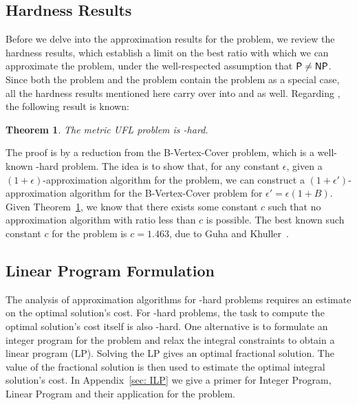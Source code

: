 \documentclass[oneside,final]{ucr}
\newtheorem{theorem}{Theorem}
\begin{document}
\subsection{Hardness Results}
Before we delve into the approximation results for the
{\UFL} problem, we review the hardness results, which
establish a limit on the best ratio with which we can
approximate the {\UFL} problem, under the well-respected
assumption that ${\mbox{\sf P}} \neq {\mbox{\sf NP}}$. Since both the {\FTFL}
problem and the {\FTFP} problem contain the {\UFL} problem
as a special case, all the hardness results mentioned here
carry over into {\FTFL} and {\FTFP} as well. Regarding
{\UFL}, the following result is known:
\begin{theorem}\cite{GuhaK98}
  \label{thm:maxsnp}
  The metric UFL problem is \MaxSNP-hard.
\end{theorem}
The proof is by a reduction from the B-Vertex-Cover problem,
which is a well-known \MaxSNP-hard problem. The idea is to
show that, for any constant $\epsilon$, given a
$(1+\epsilon)$-approximation algorithm for the {\UFL}
problem, we can construct a $(1+\epsilon')$-approximation
algorithm for the B-Vertex-Cover problem for $\epsilon' =
\epsilon(1+B)$. Given Theorem~\ref{thm:maxsnp}, we know that
there exists some constant $c$ such that no approximation
algorithm with ratio less than $c$ is possible. The best
known such constant $c$ for the {\UFL} problem is $c=1.463$,
due to Guha and Khuller~\cite{GuhaK98}.

\subsection{Linear Program Formulation}
The analysis of approximation algorithms for \NP-hard
problems requires an estimate on the optimal solution's
cost. For \NP-hard problems, the task to compute the optimal
solution's cost itself is also \NP-hard. One alternative is
to formulate an integer program for the problem and relax
the integral constraints to obtain a linear program
(LP). Solving the LP gives an optimal fractional
solution. The value of the fractional solution is then used
to estimate the optimal integral solution's cost. In
Appendix~\ref{sec: ILP} we give a primer for Integer
Program, Linear Program and their application for the {\UFL}
problem.
\end{document}
